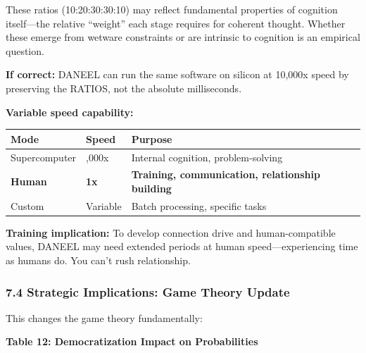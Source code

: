 \documentclass[
  11pt,
]{article}
\newcounter{none} %
\begin{document}
These ratios (10:20:30:30:10) may reflect fundamental properties of
cognition itself---the relative ``weight'' each stage requires for
coherent thought. Whether these emerge from wetware constraints or are
intrinsic to cognition is an empirical question.

\textbf{If correct:} DANEEL can run the same software on silicon at
10,000x speed by preserving the RATIOS, not the absolute milliseconds.

\textbf{Variable speed capability:}

{\def\LTcaptype{none} %
\begin{longtable}[]{@{}
  >{\raggedright\arraybackslash}p{}
  >{\raggedright\arraybackslash}p{}
  >{\raggedright\arraybackslash}p{}@{}}
\toprule\noalign{}
\begin{minipage}[b]{\linewidth}\raggedright
Mode
\end{minipage} & \begin{minipage}[b]{\linewidth}\raggedright
Speed
\end{minipage} & \begin{minipage}[b]{\linewidth}\raggedright
Purpose
\end{minipage} \\
\midrule\noalign{}
\endhead
\bottomrule\noalign{}
\endlastfoot
Supercomputer & 10,000x & Internal cognition, problem-solving \\
\textbf{Human} & \textbf{1x} & \textbf{Training, communication,
relationship building} \\
Custom & Variable & Batch processing, specific tasks \\
\end{longtable}
}

\textbf{Training implication:} To develop connection drive and
human-compatible values, DANEEL may need extended periods at human
speed---experiencing time as humans do. You can't rush relationship.

\subsubsection{7.4 Strategic Implications: Game Theory
Update}\label{strategic-implications-game-theory-update}

This changes the game theory fundamentally:

\textbf{Table 12: Democratization Impact on Probabilities}
\end{document}
